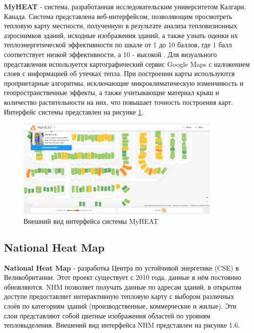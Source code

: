 \par
	\textbf{MyHEAT} - система, разработанная исследовательским университетом Калгари, Канада. Система представлена веб-интерфейсом, позволяющим просмотреть тепловую карту местности, полученную в результате анализа тепловизионных аэроснимков зданий, исходные изображения зданий, а также узнать оценки их теплоэнергетической эффективности по шкале от 1 до 10 баллов, где 1 балл соответствует низкой эффективности, а 10 - высокой \cite{problem:myheat-utilities}. Для визуального представления используется картографический сервис {Google Maps} с наложением слоев с информацией об утечках тепла. При построении карты используются проприетарные алгоритмы, исключающие микроклиматическую изменчивость и геопространственные эффекты, а также учитывающие материал крыш и количество растительности на них, что повышает точность построения карт. Интерфейс системы представлен на рисунке \ref{screens:myheat}.

	\begin{figure}[h!]
      \centering
      \includegraphics[width=0.9\textwidth]{images/screens/0_myheat.png}
      \caption{Внешний вид интерфейса системы MyHEAT}
      \label{screens:myheat}
    \end{figure}

\subsection{National Heat Map}

\par
	\textbf{National Heat Map} - разработка Центра по устойчивой энергетике (CSE) в Великобритании. Этот проект существует с 2010 года, данные в нём постоянно обновляются. NHM позволяет получать данные по адресам зданий, в открытом доступе предоставляет интерактивную тепловую карту с выбором различных слоёв по категориям зданий (производственные, коммерческие и жилые). Эти слои представляют собой цветные изображения областей по уровням тепловыделения. Внешений вид интерфейса NHM представлен на рисунке 1.6.

